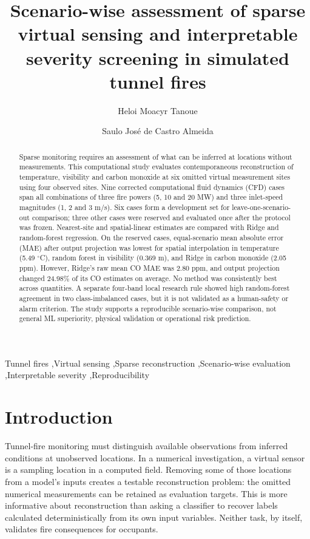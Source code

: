 \documentclass[preprint,12pt,authoryear]{elsarticle}
\begin{document}
\begin{frontmatter}
\title{Scenario-wise assessment of sparse virtual sensing and interpretable severity screening in simulated tunnel fires}
\author[unicamp]{Heloi Moacyr Tanoue}
\author[unicamp]{Saulo Jos\'e de Castro Almeida}
\address[unicamp]{Faculty of Civil Engineering, Architecture and Urbanism, University of Campinas, Campinas, Brazil}
\begin{abstract}
Sparse monitoring requires an assessment of what can be inferred at locations
without measurements. This computational study evaluates contemporaneous
reconstruction of temperature, visibility and carbon monoxide at six omitted
virtual measurement sites using four observed sites. Nine corrected
computational fluid dynamics (CFD) cases span all combinations of three fire
powers (5, 10 and 20 MW) and three inlet-speed magnitudes (1, 2 and 3 m/s).
Six cases form a development set for leave-one-scenario-out comparison; three
other cases were reserved and evaluated once after the protocol was frozen.
Nearest-site and spatial-linear estimates are compared with Ridge and
random-forest regression. On the reserved cases, equal-scenario mean absolute
error (MAE) after output projection was lowest for spatial interpolation in
temperature (5.49 $^{\circ}$C), random forest in visibility (0.369 m), and
Ridge in carbon monoxide (2.05 ppm). However, Ridge's raw mean CO MAE was
2.80 ppm, and output projection changed 24.98\% of its CO estimates on
average. No method was consistently best across quantities. A separate
four-band local research rule showed high random-forest agreement in two
class-imbalanced cases, but it is not validated as a human-safety or alarm
criterion. The study supports a reproducible scenario-wise comparison, not
general ML superiority, physical validation or operational risk prediction.
\end{abstract}
\begin{keyword}
Tunnel fires \sep Virtual sensing \sep Sparse reconstruction
\sep Scenario-wise evaluation \sep Interpretable severity \sep Reproducibility
\end{keyword}
\end{frontmatter}

\section{Introduction}
Tunnel-fire monitoring must distinguish available observations from inferred
conditions at unobserved locations. In a numerical investigation, a virtual
sensor is a sampling location in a computed field. Removing some of those
locations from a model's inputs creates a testable reconstruction problem:
the omitted numerical measurements can be retained as evaluation targets.
This is more informative about reconstruction than asking a classifier to
recover labels calculated deterministically from its own input variables.
Neither task, by itself, validates fire consequences for occupants.
\end{document}
